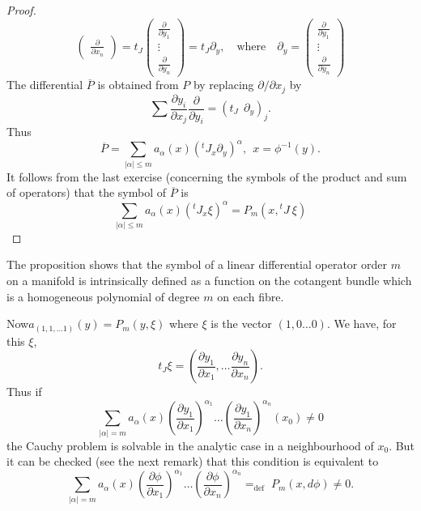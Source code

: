 \begin{proof}
$$\begin{pmatrix}
\frac{\partial}{\partial x_{n}}
\end{pmatrix}
=
t_{J}
\begin{pmatrix}
\frac{\partial}{\partial y_{1}}\\[3pt]
\vdots\\[3pt]
\frac{\partial}{\partial y_{n}}
\end{pmatrix}
=
t_{J}\partial_{y},\quad\text{where}\quad \partial_{y}=
\begin{pmatrix}
\frac{\partial}{\partial y_{1}}\\[3pt]
\vdots\\[3pt]
\frac{\partial}{\partial y_{n}}
\end{pmatrix}
$$
The differential $\overline{P}$ is obtained from $P$ by replacing $\partial/\partial x_{j}$ by
$$
\sum \frac{\partial y_{i}}{\partial x_{j}}\frac{\partial}{\partial y_{i}}=(t_{J} \ \ \partial_{y})_{j}.
$$
Thus
$$
\overline{P}=\sum\limits_{|\alpha|\leq m}a_{\alpha}(x)({}^{t}J_{x}\partial_{y})^{\alpha}, \ \ x=\phi^{-1}(y).
$$
It follows from the last exercise (concerning the symbols of the product and sum of operators) that the symbol of $\overline{P}$ is
$$
\sum\limits_{|\alpha|\leq m}a_{\alpha}(x)({}^{t}J_{x}\xi)^{\alpha}=P_{m}(x,{}^{t}J \ \xi)
$$
\end{proof}

\begin{remark*}
The proposition shows that the symbol of a linear differential operator order $m$ on a manifold is intrinsically defined as a function on the cotangent bundle which is a homogeneous polynomial of degree $m$ on each fibre.
\end{remark*}

Now\pageoriginale $a_{(1,1,\ldots 1)}(y)=P_{m}(y,\xi)$ where $\xi$ is the vector $(1,0\ldots 0)$. We have, for this $\xi$,
$$
t_{J}\xi=
\left(\frac{\partial y_{1}}{\partial x_{1}},\ldots \frac{\partial y_{n}}{\partial x_{n}}\right).
$$
Thus if
$$
\sum\limits_{|\alpha|=m}a_{\alpha}(x)\left(\frac{\partial y_{1}}{\partial x_{1}}\right)^{\alpha_{1}}\ldots \left(\frac{\partial y_{1}}{\partial x_{n}}\right)^{\alpha_{n}}(x_{0})\neq 0
$$
the Cauchy problem is solvable in the analytic case in a neighbourhood of $x_{0}$. But it can be checked (see the next remark) that this condition is equivalent to
$$
\sum\limits_{|\alpha|=m}a_{\alpha}(x)\left(\frac{\partial \phi}{\partial x_{1}}\right)^{\alpha_{1}}\ldots \left(\frac{\partial \phi}{\partial x_{n}}\right)^{\alpha_{n}}{\displaystyle{\mathop{=}_{\text{def}}}}\;P_{m}(x,d\phi)\neq 0.
$$

